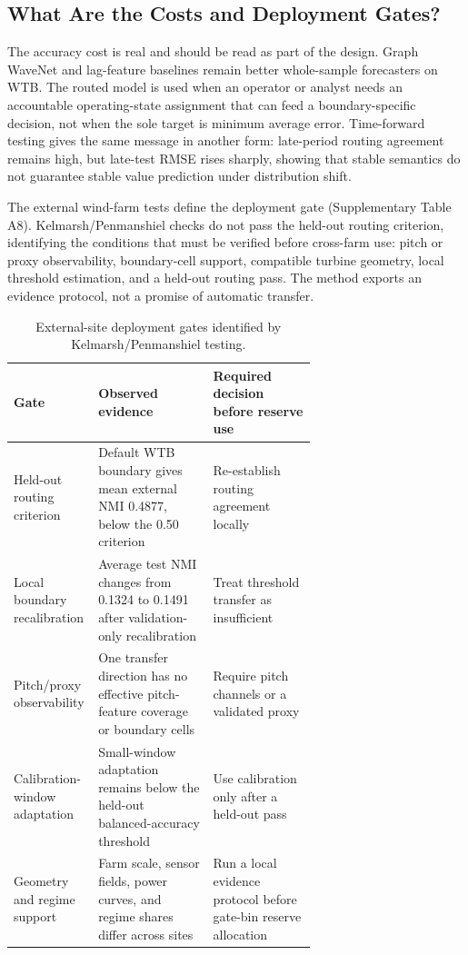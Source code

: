 \documentclass[
  11pt]{article}
\begin{document}
\subsection{What Are the Costs and Deployment
Gates?}\label{what-are-the-costs-and-deployment-gates}

The accuracy cost is real and should be read as part of the design.
Graph WaveNet and lag-feature baselines remain better whole-sample
forecasters on WTB. The routed model is used when an operator or analyst
needs an accountable operating-state assignment that can feed a
boundary-specific decision, not when the sole target is minimum average
error. Time-forward testing gives the same message in another form:
late-period routing agreement remains high, but late-test RMSE rises
sharply, showing that stable semantics do not guarantee stable value
prediction under distribution shift.

The external wind-farm tests define the deployment gate (Supplementary
Table A8). Kelmarsh/Penmanshiel checks do not pass the held-out routing
criterion, identifying the conditions that must be verified before
cross-farm use: pitch or proxy observability, boundary-cell support,
compatible turbine geometry, local threshold estimation, and a held-out
routing pass. The method exports an evidence protocol, not a promise of
automatic transfer.

\begin{table}[H]
\centering
\footnotesize
\setlength{\tabcolsep}{4pt}
\renewcommand{\arraystretch}{1.08}
\caption{External-site deployment gates identified by Kelmarsh/Penmanshiel testing.}
\begin{tabularx}{0.98\linewidth}{>{\raggedright\arraybackslash}p{0.28\linewidth} >{\raggedright\arraybackslash}p{0.38\linewidth} >{\raggedright\arraybackslash}X}
\toprule
Gate & Observed evidence & Required decision before reserve use \\
\midrule
Held-out routing criterion & Default WTB boundary gives mean external NMI 0.4877, below the 0.50 criterion & Re-establish routing agreement locally \\
Local boundary recalibration & Average test NMI changes from 0.1324 to 0.1491 after validation-only recalibration & Treat threshold transfer as insufficient \\
Pitch/proxy observability & One transfer direction has no effective pitch-feature coverage or boundary cells & Require pitch channels or a validated proxy \\
Calibration-window adaptation & Small-window adaptation remains below the held-out balanced-accuracy threshold & Use calibration only after a held-out pass \\
Geometry and regime support & Farm scale, sensor fields, power curves, and regime shares differ across sites & Run a local evidence protocol before gate-bin reserve allocation \\
\bottomrule
\end{tabularx}
\end{table}
\end{document}
